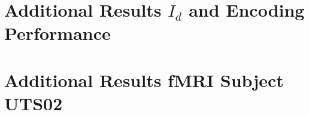 \documentclass{article}
\theoremstyle{plain}
\theoremstyle{definition}
\theoremstyle{remark}
\begin{document}
%     
%     

\FloatBarrier 
\section{Additional Results $I_d$ and Encoding Performance}
\label{app:id_corr}
\setcounter{figure}{0}    
\setcounter{table}{0} 

\begin{table}[H]
\caption{\textbf{Max layer index} for $I_d$, fMRI encoding performance (average across subjects UTS02 and UTS03), and ECoG encoding. The layers around the $I_d$ peak are the best for encoding, as seen by the small distance between the first column and next two columns.}
\label{tab:best_layers_abs}
\centering 
{}
\end{table}

\FloatBarrier 
\section{Additional Results fMRI Subject UTS02}
\label{app:subj_2}
\setcounter{figure}{0}    
\setcounter{table}{0} 
\end{document}
